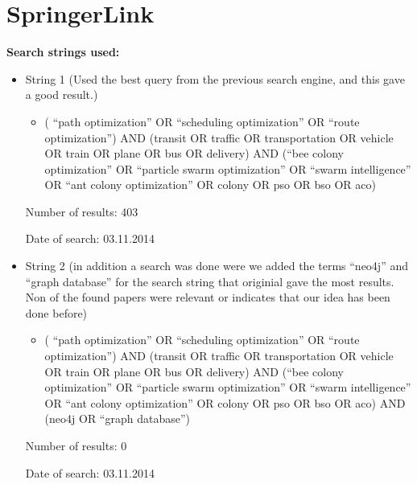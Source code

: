 \section{SpringerLink}
\textbf{Search strings used:}
\begin{itemize}
\item String 1 (Used the best query from the previous search engine, and this gave a good result.)
\begin{itemize}
\item ( ``path optimization'' OR ``scheduling optimization'' OR ``route optimization'') AND (transit OR traffic OR transportation OR vehicle OR train OR plane OR bus OR delivery) AND (``bee colony optimization'' OR ``particle swarm optimization'' OR ``swarm intelligence'' OR ``ant colony optimization'' OR colony OR pso OR bso OR aco)
\end{itemize}
\par
Number of results: 403
\par
Date of search: 03.11.2014
\end{itemize}
\begin{itemize}
\item String 2 (in addition a search was done were we added the terms ``neo4j'' and ``graph database'' for the search string that originial gave the most results. Non of the found papers were relevant or indicates that our idea has been done before)
\begin{itemize}
\item ( ``path optimization'' OR ``scheduling optimization'' OR ``route optimization'') AND (transit OR traffic OR transportation OR vehicle OR train OR plane OR bus OR delivery) AND (``bee colony optimization'' OR ``particle swarm optimization'' OR ``swarm intelligence'' OR ``ant colony optimization'' OR colony OR pso OR bso OR aco) AND (neo4j OR ``graph database'')
\end{itemize}
\par
Number of results: 0
\par
Date of search: 03.11.2014
\end{itemize}


